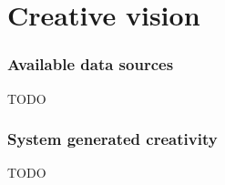 \part{Creative vision}
\label{part:creative_vision}


\section{Available data sources}
\label{sec:data_sources}

TODO


\section{System generated creativity}
\label{sec:generated_creativity}

TODO


